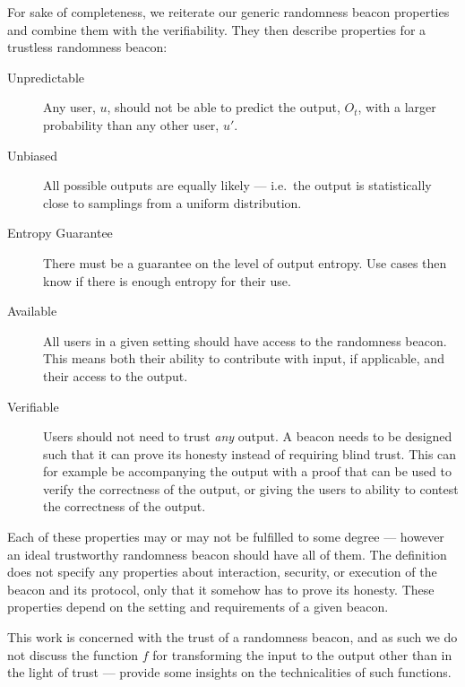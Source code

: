 
For sake of completeness, we reiterate our generic randomness beacon properties and combine them with the verifiability.
They then describe properties for a trustless randomness beacon:

\begin{description}
    \item[Unpredictable]
        Any user, $u$, should not be able to predict the output, $O_t$, with a larger probability than any other user, $u'$.
    \item[Unbiased]
        All possible outputs are equally likely --- i.e.\ the output is statistically close to samplings from a uniform distribution.
    \item[Entropy Guarantee]
        There must be a guarantee on the level of output entropy.
        Use cases then know if there is enough entropy for their use.
    \item[Available]
        All users in a given setting should have access to the randomness beacon.
        This means both their ability to contribute with input, if applicable, and their access to the output.
    \item[Verifiable]
        Users should not need to trust \emph{any} output.
        A beacon needs to be designed such that it can prove its honesty instead of requiring blind trust.
        This can for example be accompanying the output with a proof that can be used to verify the correctness of the output, or giving the users to ability to contest the correctness of the output.
\end{description}

Each of these properties may or may not be fulfilled to some degree --- however an ideal trustworthy randomness beacon should have all of them.
The definition does not specify any properties about interaction, security, or execution of the beacon and its protocol, only that it somehow has to prove its honesty.
These properties depend on the setting and requirements of a given beacon.

This work is concerned with the trust of a randomness beacon, and as such we do not discuss the function $f$ for transforming the input to the output other than in the light of trust --- \citet{bonneau2015bitcoin, dodis2004randomness} provide some insights on the technicalities of such functions.
